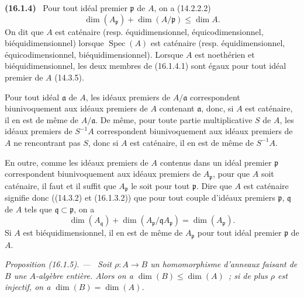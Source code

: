 \documentclass[10pt,oneside]{book}
\makeatletter
\newcommand{\setmanualcurrentlabel}[1]{\def\@currentlabel{#1}}
\newenvironment{env}[1][]{\setmanualcurrentlabel{#1}\par\medskip\noindent\textbf{(#1)}\ }{\par}
\newenvironment{proposition}[1][]{%
  \setmanualcurrentlabel{#1}\par\medskip\noindent\itshape Proposition (#1). ---\ }{\par}
\makeatother
\begin{document}
\begin{env}[16.1.4]
\label{0.16.1.4-fr}
Pour tout idéal premier $\mathfrak{p}$ de $A$, on a (14.2.2.2)
\[
\label{0.16.1.4.1-fr}
  \dim(A_{\mathfrak{p}})+\dim(A/\mathfrak{p})\leq\dim A.
\tag{16.1.4.1}
\]
On dit que $A$ est caténaire (resp. équidimensionnel, équicodimensionnel,
biéquidimensionnel) lorsque $\operatorname{Spec}(A)$ est caténaire (resp.
équidimensionnel,
équicodimensionnel, biéquidimensionnel). Lorsque $A$ est noethérien et
biéquidimensionnel, les deux membres de (16.1.4.1) sont égaux pour tout idéal
premier de $A$ (14.3.5).

Pour tout idéal $\mathfrak{a}$ de $A$, les idéaux premiers de
$A/\mathfrak{a}$ correspondent biunivoquement aux idéaux premiers de $A$
contenant $\mathfrak{a}$, donc, si $A$ est caténaire, il en est de même de
$A/\mathfrak{a}$. De même, pour toute partie multiplicative $S$ de $A$, les
idéaux premiers de $S^{-1}A$ correspondent biunivoquement aux idéaux premiers
de $A$ ne rencontrant pas $S$, donc si $A$ est caténaire, il en est de même de
$S^{-1}A$.

En outre, comme les idéaux premiers de $A$ contenus dans un idéal premier
$\mathfrak{p}$ correspondent biunivoquement aux idéaux premiers de
$A_{\mathfrak{p}}$, pour que $A$ soit caténaire, il faut et il suffit que
$A_{\mathfrak{p}}$ le soit pour tout $\mathfrak{p}$. Dire que $A$ est
caténaire signifie donc ((14.3.2) et (16.1.3.2)) que pour tout couple d'idéaux
premiers $\mathfrak{p}$, $\mathfrak{q}$ de $A$ tels que
$\mathfrak{q}\subset\mathfrak{p}$, on a
\[
\label{0.16.1.4.2-fr}
  \dim(A_{\mathfrak{q}})
  +\dim(A_{\mathfrak{p}}/\mathfrak{q}A_{\mathfrak{p}})
  =\dim(A_{\mathfrak{p}}).
\tag{16.1.4.2}
\]
Si $A$ est biéquidimensionnel, il en est de même de $A_{\mathfrak{p}}$ pour
tout idéal premier $\mathfrak{p}$ de $A$.
\end{env}

\begin{proposition}[16.1.5]
\label{0.16.1.5-fr}
Soit $\rho:A\to B$ un homomorphisme d'anneaux faisant de $B$ une $A$-algèbre
entière. Alors on a $\dim(B)\leq\dim(A)$~; si de plus $\rho$ est injectif, on a
$\dim(B)=\dim(A)$.
\end{proposition}
\end{document}

